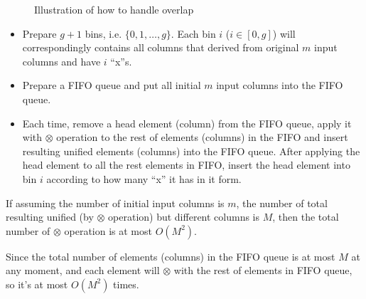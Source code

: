 \begin{figure}[!ht]
\begin{minipage}[b]{0.3\linewidth}
\caption{Illustration of how to handle overlap}
\label{fig:dag-overlap}
\end{minipage}
\end{figure}

\begin{itemize}
    \item Prepare $g+1$ bins, i.e. $\{0, 1, \ldots, g\}$. Each bin $i$
    ($i \in [0, g]$) will correspondingly contains all columns that
    derived from original $m$ input columns and have $i$ ``x''s.

    \item Prepare a {FIFO} queue and put all initial $m$ input columns 
    into the {FIFO} queue. 

    \item Each time, remove a head element (column) from the {FIFO}
    queue, apply it with $\otimes$ operation to the rest of elements
    (columns) in the {FIFO} and insert resulting unified elements (columns)
    into the {FIFO} queue. After applying the head element to all
    the rest elements in {FIFO}, insert the head element into bin $i$
    according to how many ``x'' it has in it form.

\end{itemize}

\begin{theorem}
If assuming the number of initial input columns is $m$, the number of
total resulting unified (by $\otimes$ operation) but different columns
is $M$, then the total number of $\otimes$ operation is at most $O(M^2)$.
\label{thm:totalNodes}
\end{theorem}

\begin{IEEEproof}
Since the total number of elements (columns) in the {FIFO} queue is at
most $M$ at any moment, and each element will $\otimes$ with the rest
of elements in {FIFO} queue, so it's at most $O(M^2)$ times.
\end{IEEEproof}

